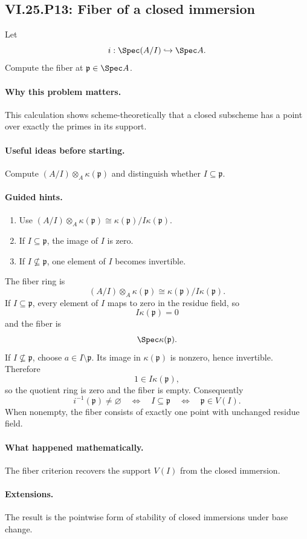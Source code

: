 \subsection*{VI.25.P13: Fiber of a closed immersion}
\begin{problem}\label{prob:vi25-p13}
Let
\[
i:\Spec(A/I)\hookrightarrow\Spec A.
\]
Compute the fiber at \(\mathfrak p\in\Spec A\).
\end{problem}

\ifdefined\FullProblemDossiers
\paragraph{Why this problem matters.}
This calculation shows scheme-theoretically that a closed subscheme has a point over exactly the primes in its support.

\paragraph{Useful ideas before starting.}
Compute \((A/I)\otimes_A\kappa(\mathfrak p)\) and distinguish whether \(I\subseteq\mathfrak p\).

\paragraph{Guided hints.}
\begin{enumerate}
\item Use \((A/I)\otimes_A\kappa(\mathfrak p)\cong\kappa(\mathfrak p)/I\kappa(\mathfrak p)\).
\item If \(I\subseteq\mathfrak p\), the image of \(I\) is zero.
\item If \(I\nsubseteq\mathfrak p\), one element of \(I\) becomes invertible.
\end{enumerate}

\begin{solution}
The fiber ring is
\[
(A/I)\otimes_A\kappa(\mathfrak p)
\cong
\kappa(\mathfrak p)/I\kappa(\mathfrak p).
\]
If \(I\subseteq\mathfrak p\), every element of \(I\) maps to zero in the residue field, so
\[
I\kappa(\mathfrak p)=0
\]
and the fiber is
\[
\Spec\kappa(\mathfrak p).
\]
If \(I\nsubseteq\mathfrak p\), choose \(a\in I\setminus\mathfrak p\).  Its image in \(\kappa(\mathfrak p)\) is nonzero, hence invertible.  Therefore
\[
1\in I\kappa(\mathfrak p),
\]
so the quotient ring is zero and the fiber is empty.  Consequently
\[
i^{-1}(\mathfrak p)\ne\varnothing
\quad\Longleftrightarrow\quad
I\subseteq\mathfrak p
\quad\Longleftrightarrow\quad
\mathfrak p\in V(I).
\]
When nonempty, the fiber consists of exactly one point with unchanged residue field.
\end{solution}

\paragraph{What happened mathematically.}
The fiber criterion recovers the support \(V(I)\) from the closed immersion.

\paragraph{Extensions.}
The result is the pointwise form of stability of closed immersions under base change.
\fi
